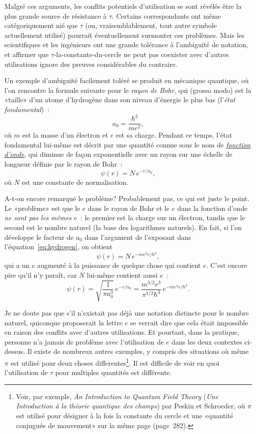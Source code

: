 Malgré ces arguments, les conflits potentiels d'utilisation se sont révélés être
la plus grande source de résistance à $\tau$. Certains correspondants ont même
catégoriquement nié que $\tau$ (ou, vraisemblablement, tout autre symbole
actuellement utilisé) pourrait éventuellement surmonter ces problèmes. Mais les
scientifiques et les ingénieurs ont une grande tolérance à l'ambiguïté de
notation, et affirmer que $\tau$-la-constante-du-cercle ne peut pas coexister
avec d'autres utilisations ignore des preuves considérables du contraire.

Un exemple d'ambiguïté facilement toléré se produit en mécanique quantique, où
l'on rencontre la formule suivante pour le \emph{rayon de Bohr}, qui (grosso
modo) est la «\ns taille\ns » d'un atome d'hydrogène dans son niveau d'énergie le
plus bas (l'\emph{état fondamental})~:
\[
a_0 = \frac{\hbar^2}{m e^2},
\]
où $m$ est la masse d'un électron et $e$ est sa charge. Pendant ce temps, l'état
fondamental lui-même est décrit par une quantité connue sous le nom de
\href{https://fr.wikipedia.org/wiki/Fonction_d%27onde}{\emph{fonction d'onde}},
qui diminue de façon exponentielle avec un rayon sur une échelle de longueur
définie par le rayon de Bohr~:
\begin{equation}
\label{eq:hydrogen}
\psi(r) = N\,e^{-r/a_0},
\end{equation}
où $N$ est une constante de normalisation.

A-t-on encore remarqué le problème\ns? Probablement pas, ce qui est juste le
point. Le «\ns problème\ns » est que le $e$ dans le rayon de Bohr et le $e$ dans la
fonction d'onde \emph{ne sont pas les mêmes $e$}~: le premier est la charge sur
un électron, tandis que le second est le nombre naturel (la base des logarithmes
naturels). En fait, si l'on développe le facteur de $a_0$ dans l'argument de
l'exposant dans l'équation~\eqref{eq:hydrogen}, on obtient
\[
\psi(r) = N\,e^{-m e^2 r/\hbar^2},
\]
qui a un $e$ augmenté à la puissance de quelque chose qui contient $e$. C'est
encore pire qu'il n'y paraît, car $N$ lui-même contient aussi $e$~:
\[
\psi(r) = \sqrt{\frac{1}{\pi a_0^3}}\,e^{-r/a_0} =
\frac{m^{3/2} e^3}{\pi^{1/2} \hbar^3}\,e^{-m e^2 r/\hbar^2}.
\]

Je ne doute pas que s'il n'existait pas déjà une notation distincte pour le
nombre naturel, quiconque proposerait la lettre $e$ se verrait dire que cela
était impossible en raison des conflits avec d'autres utilisations. Et pourtant,
dans la pratique, personne n'a jamais de problème avec l'utilisation de $e$ dans
les deux contextes ci-dessus. Il existe de nombreux autres exemples, y compris
des situations où même $\pi$ est utilisé pour deux choses
differentes\ns\footnote{Voir, par exemple, \emph{An Introduction to Quantum Field
Theory} (\emph{Une Introduction à la théorie quantique des champs}) par Peskin
et Schroeder, où $\pi$ est utilisé pour désigner à la fois la constante du
cercle et une «\ns quantité conjuguée de mouvement\ns » sur la même page
(page~282).}. Il est difficile de voir en quoi l'utilisation de $\tau$ pour
multiples quantités est différente.

